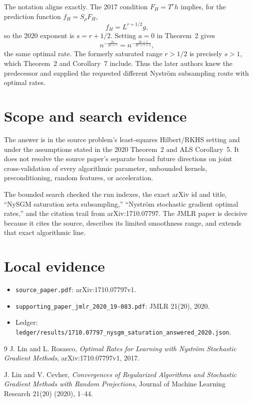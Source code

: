 \documentclass[11pt]{article}
\begin{document}
The notation aligns exactly.  The 2017 condition
$F_H=T^r h$ implies, for the prediction function $f_H=S_\rho F_H$,
\[
 f_H=L^{r+1/2}g,
\]
so the 2020 exponent is $s=r+1/2$.  Setting $a=0$ in Theorem~2 gives
\[
 n^{-\frac{2s}{2s+\gamma}}
 =n^{-\frac{2r+1}{2r+\gamma+1}},
\]
the same optimal rate.  The formerly saturated range $r>1/2$ is precisely
$s>1$, which Theorem~2 and Corollary~7 include.  Thus the later authors knew
the predecessor and supplied the requested different Nystr\"om subsampling
route with optimal rates.

\section*{Scope and search evidence}

The answer is in the source problem's least-squares Hilbert/RKHS setting and
under the assumptions stated in the 2020 Theorem~2 and ALS Corollary~5.  It
does not resolve the source paper's separate broad future directions on joint
cross-validation of every algorithmic parameter, unbounded kernels,
preconditioning, random features, or acceleration.

The bounded search checked the run indexes, the exact arXiv id and title,
``NySGM saturation zeta subsampling,'' ``Nystr\"om stochastic gradient
optimal rates,'' and the citation trail from arXiv:1710.07797.  The JMLR paper
is decisive because it cites the source, describes its limited smoothness
range, and extends that exact algorithmic line.

\section*{Local evidence}

\begin{itemize}
\item \texttt{source\_paper.pdf}: arXiv:1710.07797v1.
\item \texttt{supporting\_paper\_jmlr\_2020\_19-083.pdf}: JMLR 21(20),
2020.
\item Ledger: \texttt{ledger/results/1710.07797\_nysgm\_saturation\_answered\_2020.json}.
\end{itemize}

\begin{thebibliography}{9}
J. Lin and L. Rosasco,
\emph{Optimal Rates for Learning with Nystr\"om Stochastic Gradient Methods},
arXiv:1710.07797v1, 2017.

J. Lin and V. Cevher,
\emph{Convergences of Regularized Algorithms and Stochastic Gradient Methods
with Random Projections},
Journal of Machine Learning Research 21(20) (2020), 1--44.
\end{thebibliography}
\end{document}
